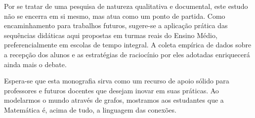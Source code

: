 \documentclass[
  12pt,
  oneside,
  a4paper,
  english,
  brazilian
  ]{abntex2}
\theoremstyle{definition}
\begin{document}
Por se tratar de uma pesquisa de natureza qualitativa e documental, este estudo não se encerra em si mesmo, mas atua como um ponto de partida. Como encaminhamento para trabalhos futuros, sugere-se a aplicação prática das sequências didáticas aqui propostas em turmas reais do Ensino Médio, preferencialmente em escolas de tempo integral. A coleta empírica de dados sobre a recepção dos alunos e as estratégias de raciocínio por eles adotadas enriquecerá ainda mais o debate.

Espera-se que esta monografia sirva como um recurso de apoio sólido para professores e futuros docentes que desejam inovar em suas práticas. Ao modelarmos o mundo através de grafos, mostramos aos estudantes que a Matemática é, acima de tudo, a linguagem das conexões.

\postextual


\end{document}
